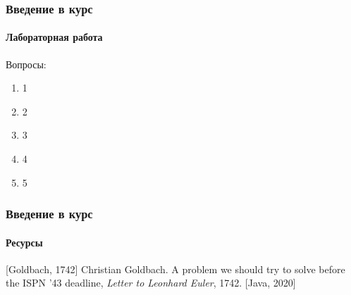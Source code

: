 \documentclass[aspectratio=169, 12pt]{beamer}
\begin{document}
\begin{frame}[t]
    \frametitle{Введение в курс}
    \framesubtitle{Лабораторная работа }
    Вопросы:
    \begin{enumerate}
        \item 1
        \item 2
        \item 3
        \item 4
        \item 5
    \end{enumerate}
\end{frame}

\begin{frame}[t]
    \frametitle{Введение в курс}
    \framesubtitle{Ресурсы}
    \begin{thebibliography}{10}
        [Goldbach, 1742]
        Christian Goldbach.
        \newblock A problem we should try to solve before the ISPN ’43 deadline,
        \newblock \emph{Letter to Leonhard Euler}, 1742.
        [Java, 2020]
    \end{thebibliography}
\end{frame}
\end{document}
